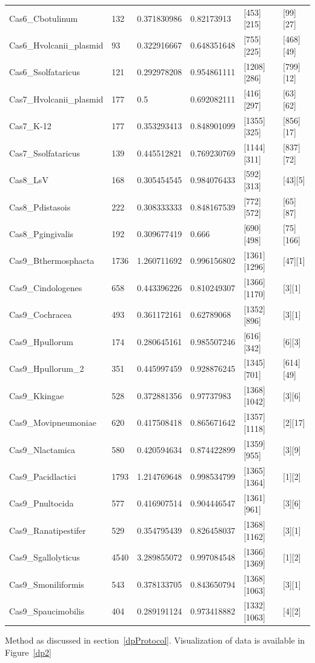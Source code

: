 \documentclass[11pt, oneside]{article}
\begin{document}
\begin{minipage}{\linewidth}
\begin{tabular}{ p{1.25in} C{.85in} *4{C{.75in}}}
Cas6\_Cbotulinum & 132 & 0.371830986 & 0.82173913 & [453][215] & [99][27]\\ 
Cas6\_Hvolcanii\_plasmid & 93 & 0.322916667 & 0.648351648 & [755][225] & [468][49]\\ 
Cas6\_Ssolfataricus & 121 & 0.292978208 & 0.954861111 & [1208][286] & [799][12]\\ 
Cas7\_Hvolcanii\_plasmid & 177 & 0.5 & 0.692082111 & [416][297] & [63][62]\\ 
Cas7\_K-12 & 177 & 0.353293413 & 0.848901099 & [1355][325] & [856][17]\\ 
Cas7\_Ssolfataricus & 139 & 0.445512821 & 0.769230769 & [1144][311] & [837][72]\\ 
Cas8\_LsV & 168 & 0.305454545 & 0.984076433 & [592][313] & [43][5]\\ 
Cas8\_Pdistasois & 222 & 0.308333333 & 0.848167539 & [772][572] & [65][87]\\ 
Cas8\_Pgingivalis & 192 & 0.309677419 & 0.666 & [690][498] & [75][166]\\ 
Cas9\_Bthermosphacta & 1736 & 1.260711692 & 0.996156802 & [1361][1296] & [47][1]\\ 
Cas9\_Cindologenes & 658 & 0.443396226 & 0.810249307 & [1366][1170] & [3][1]\\ 
Cas9\_Cochracea & 493 & 0.361172161 & 0.62789068 & [1352][896] & [3][1]\\ 
Cas9\_Hpullorum & 174 & 0.280645161 & 0.985507246 & [616][342] & [6][3]\\ 
Cas9\_Hpullorum\_2 & 351 & 0.445997459 & 0.928876245 & [1345][701] & [614][49]\\ 
Cas9\_Kkingae & 528 & 0.372881356 & 0.97737983 & [1368][1042] & [3][6]\\ 
Cas9\_Movipneumoniae & 620 & 0.417508418 & 0.865671642 & [1357][1118] & [2][17]\\ 
Cas9\_Nlactamica & 580 & 0.420594634 & 0.874422899 & [1359][955] & [3][9]\\ 
Cas9\_Pacidlactici & 1793 & 1.214769648 & 0.998534799 & [1365][1364] & [1][2]\\ 
Cas9\_Pnultocida & 577 & 0.416907514 & 0.904446547 & [1361][961] & [3][6]\\ 
Cas9\_Ranatipestifer & 529 & 0.354795439 & 0.826458037 & [1368][1162] & [3][1]\\ 
Cas9\_Sgallolyticus & 4540 & 3.289855072 & 0.997084548 & [1366][1369] & [1][2]\\ 
Cas9\_Smoniliformis & 543 & 0.378133705 & 0.843650794 & [1368][1063] & [3][1]\\ 
Cas9\_Spaucimobilis & 404 & 0.289191124 & 0.973418882 & [1332][1063] & [4][2]\\
\bottomrule[1.25pt]
\end {tabular}\par
\bigskip
Method as discussed in section~\ref{dpProtocol}. Visualization of data is available in Figure~\ref{dp2}
\end{minipage}
\end{document}
